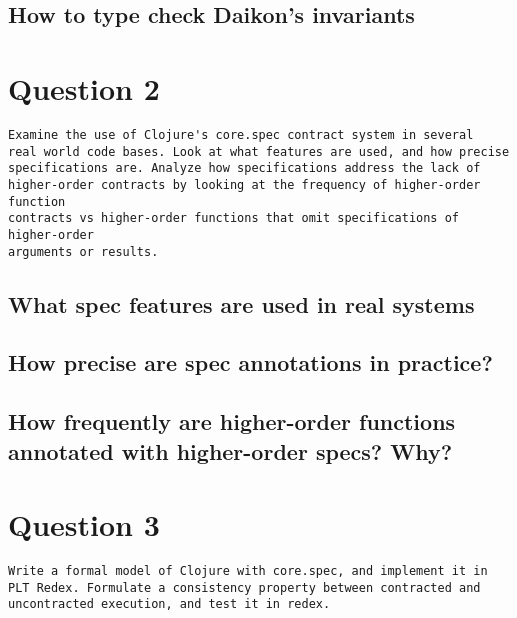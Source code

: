 \documentclass[10pt]{article}
\begin{document}
\subsection*{How to type check Daikon's invariants}


\section*{Question 2}

\begin{verbatim}
Examine the use of Clojure's core.spec contract system in several
real world code bases. Look at what features are used, and how precise
specifications are. Analyze how specifications address the lack of
higher-order contracts by looking at the frequency of higher-order function
contracts vs higher-order functions that omit specifications of higher-order
arguments or results.
\end{verbatim}

\subsection*{What spec features are used in real systems}

\subsection*{How precise are spec annotations in practice?}

\subsection*{How frequently are higher-order functions annotated with higher-order specs? Why?}

\section*{Question 3}

\begin{verbatim}
Write a formal model of Clojure with core.spec, and implement it in
PLT Redex. Formulate a consistency property between contracted and
uncontracted execution, and test it in redex.
\end{verbatim}


\end{document}
